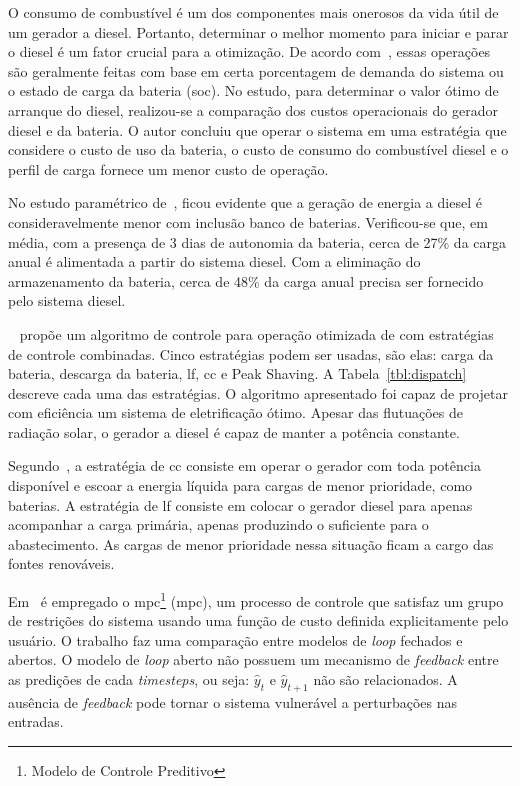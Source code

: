 O consumo de combustível é um dos componentes mais onerosos da vida útil de um
gerador a diesel.  Portanto, determinar o melhor momento para iniciar e parar o
diesel é um fator crucial para a otimização.  De acordo
com~\cite{ashari1999optimum}, essas operações são geralmente feitas com base em
certa porcentagem de demanda do sistema ou o estado de carga da bateria
(\acrshort{soc}).  No estudo, para determinar o valor ótimo de arranque do
diesel, realizou-se a comparação dos custos operacionais do gerador diesel e da
bateria.  O autor concluiu que operar o sistema em uma estratégia que considere
o custo de uso da bateria, o custo de consumo do combustível diesel e o perfil
de carga fornece um menor custo de operação.

No estudo paramétrico de~\cite{elhadidy2000parametric}, ficou evidente que a
geração de energia a diesel é consideravelmente menor com inclusão banco de
baterias. Verificou-se que, em média, com a presença de 3 dias de autonomia da
bateria, cerca de 27\% da carga anual é alimentada a partir do sistema diesel.
Com a eliminação do armazenamento da bateria, cerca de 48\% da carga anual
precisa ser fornecido pelo sistema diesel.

~\cite{gupta2011modelling} propõe um algoritmo de controle para operação
otimizada de com estratégias de controle combinadas.  Cinco estratégias podem
ser usadas, são elas: carga da bateria, descarga da bateria, \acrlong{lf},
\acrlong{cc} e Peak Shaving. A Tabela~\ref{tbl:dispatch} descreve cada uma das
estratégias. O algoritmo apresentado foi capaz de projetar com eficiência um
sistema de eletrificação ótimo. Apesar das flutuações de radiação solar, o
gerador a diesel é capaz de manter a potência constante.



Segundo~\cite{homermanual}, a estratégia de \acrlong{cc} consiste em operar o
gerador com toda potência disponível e escoar a energia líquida para cargas de
menor prioridade, como baterias.  A estratégia de \acrlong{lf} consiste em
colocar o gerador diesel para apenas acompanhar a carga primária, apenas
produzindo o suficiente para o abastecimento. As cargas de menor prioridade
nessa situação ficam a cargo das fontes renováveis.

Em~\cite{tazvinga2014energy} é empregado o \acrlong{mpc}\footnote{Modelo de
Controle Preditivo} (\acrshort{mpc}), um processo de controle que satisfaz um
grupo de restrições do sistema usando uma função de custo definida
explicitamente pelo usuário.  O trabalho faz uma comparação entre modelos de
\emph{loop} fechados e abertos.  O modelo de \emph{loop} aberto não possuem um
mecanismo de \emph{feedback} entre as predições de cada \emph{timesteps}, ou
seja: $\hat{y}_{t}$ e $\hat{y}_{t+1}$ não são relacionados.  A ausência de
\emph{feedback} pode tornar o sistema vulnerável a perturbações nas entradas.

